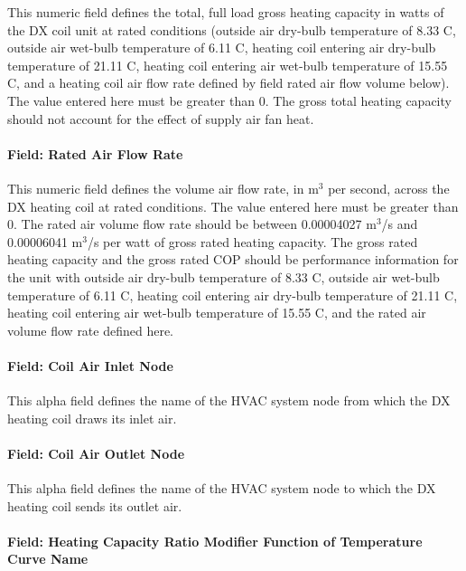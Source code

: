 This numeric field defines the total, full load gross heating capacity in watts of the DX coil unit at rated conditions (outside air dry-bulb temperature of 8.33 C, outside air wet-bulb temperature of 6.11 C, heating coil entering air dry-bulb temperature of 21.11 C, heating coil entering air wet-bulb temperature of 15.55 C, and a heating coil air flow rate defined by field rated air flow volume below). The value entered here must be greater than 0. The gross total heating capacity should not account for the effect of supply air fan heat.

\paragraph{Field: Rated Air Flow Rate}\label{field-rated-air-flow-rate-1}

This numeric field defines the volume air flow rate, in m\(^{3}\) per second, across the DX heating coil at rated conditions. The value entered here must be greater than 0. The rated air volume flow rate should be between 0.00004027 m\(^{3}\)/s and 0.00006041 m\(^{3}\)/s per watt of gross rated heating capacity. The gross rated heating capacity and the gross rated COP should be performance information for the unit with outside air dry-bulb temperature of 8.33 C, outside air wet-bulb temperature of 6.11 C, heating coil entering air dry-bulb temperature of 21.11 C, heating coil entering air wet-bulb temperature of 15.55 C, and the rated air volume flow rate defined here.

\paragraph{Field: Coil Air Inlet Node}\label{field-coil-air-inlet-node}

This alpha field defines the name of the HVAC system node from which the DX heating coil draws its inlet air.

\paragraph{Field: Coil Air Outlet Node}\label{field-coil-air-outlet-node}

This alpha field defines the name of the HVAC system node to which the DX heating coil sends its outlet air.

\paragraph{Field: Heating Capacity Ratio Modifier Function of Temperature Curve Name}\label{field-heating-capacity-ratio-modifier-function-of-temperature-curve-name}

